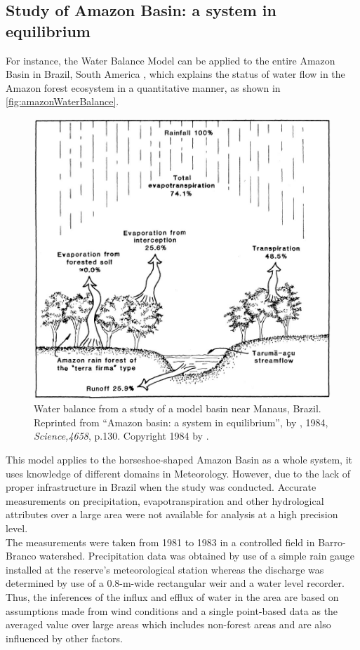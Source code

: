 \subsection{Study of Amazon Basin: a system in equilibrium}
For instance, the Water Balance Model can be applied to the entire Amazon Basin in Brazil, South America  \citep{Salati1984a}, which explains the status of water flow in the Amazon forest ecosystem in a quantitative manner, as shown in \autoref{fig:amazonWaterBalance}. \\
\begin{figure}[bth]
\begin{center}
\includegraphics[width=.75\linewidth]{gfx/amazonWaterBalance}
\end{center}
\caption{Water balance from a study of a model basin near Manaus, Brazil\citep{Leopoldo1982}. Reprinted from ``Amazon basin: a system in equilibrium'', by \citeauthor{Salati1984a}, 1984, \emph{Science,4658}, p.130. Copyright 1984 by \citeauthor{Salati1984a}.  }
\label{fig:amazonWaterBalance}
\end{figure}
\newline
This model applies to the horseshoe-shaped Amazon Basin as a whole system, it uses knowledge of different domains in Meteorology. However, due to the lack of proper infrastructure in Brazil when the study was conducted. Accurate measurements on precipitation, evapotranspiration and other hydrological attributes over a large area were not available for analysis at a high precision level. \\
\newline
The measurements were taken from 1981 to 1983 in a controlled field in Barro-Branco watershed\citep{Leopoldo1995}. Precipitation data was obtained by use of a simple rain gauge installed at the reserve's meteorological station whereas the discharge was determined by use of a 0.8-m-wide rectangular weir and a water level recorder. Thus, the inferences of the influx and efflux of water in the area are based on assumptions made from wind conditions and a single point-based data as the averaged value over large areas which includes non-forest areas and are also influenced by other factors. 

